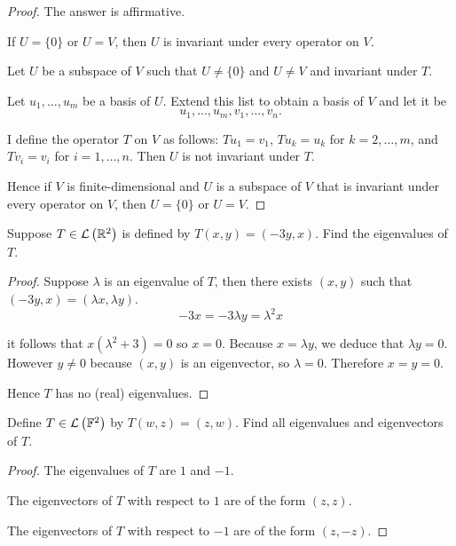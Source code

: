 \begin{proof}
    The answer is affirmative.

    If $U = \{0\}$ or $U = V$, then $U$ is invariant under every operator on $V$.

    Let $U$ be a subspace of $V$ such that $U\ne \{0\}$ and $U\ne V$ and invariant under $T$.

    Let $u_{1}, \ldots, u_{m}$ be a basis of $U$. Extend this list to obtain a basis of $V$ and let it be
    \[
        u_{1}, \ldots, u_{m}, v_{1}, \ldots, v_{n}.
    \]

    I define the operator $T$ on $V$ as follows: $Tu_{1} = v_{1}$, $Tu_{k} = u_{k}$ for $k = 2,\ldots, m$, and $Tv_{i} = v_{i}$ for $i = 1,\ldots, n$. Then $U$ is not invariant under $T$.

    Hence if $V$ is finite-dimensional and $U$ is a subspace of $V$ that is invariant under every operator on $V$, then $U = \{0\}$ or $U = V$.
\end{proof}
\newpage

\begin{exercise}
    Suppose $T\in\mathcal{L}\left({\mathbb{R}^{2}}\right)$ is defined by $T(x, y) = (-3y, x)$. Find the eigenvalues of $T$.
\end{exercise}

\begin{proof}
    Suppose $\lambda$ is an eigenvalue of $T$, then there exists $(x, y)$ such that $(-3y, x) = (\lambda x, \lambda y)$.
    \[
        -3x = -3\lambda y = \lambda^{2}x
    \]

    it follows that $x(\lambda^{2} + 3) = 0$ so $x = 0$. Because $x = \lambda y$, we deduce that $\lambda y = 0$. However $y\ne 0$ because $(x, y)$ is an eigenvector, so $\lambda = 0$. Therefore $x = y = 0$.

    Hence $T$ has no (real) eigenvalues.
\end{proof}
\newpage

\begin{exercise}
    Define $T\in\mathcal{L}\left({\mathbb{F}^{2}}\right)$ by $T(w, z) = (z, w)$. Find all eigenvalues and eigenvectors of $T$.
\end{exercise}

\begin{proof}
    The eigenvalues of $T$ are $1$ and $-1$.

    The eigenvectors of $T$ with respect to $1$ are of the form $(z, z)$.

    The eigenvectors of $T$ with respect to $-1$ are of the form $(z, -z)$.
\end{proof}
\newpage

